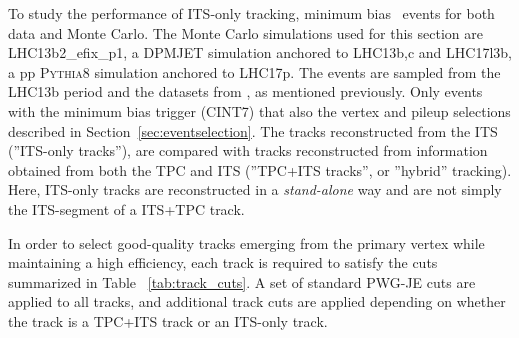 To study the performance of ITS-only tracking, minimum bias \pPb~events for both data and Monte Carlo. The Monte Carlo simulations used for this section are LHC13b2\_efix\_p1, a \textsc{DPMJET} simulation anchored to LHC13b,c and LHC17l3b, a pp \textsc{Pythia8} simulation anchored to LHC17p. The events are sampled from the LHC13b period and the datasets from \cite{Acharya:2018qsh}, as mentioned previously. Only events with the minimum bias trigger (CINT7) that also the vertex and pileup selections described in Section~\ref{sec:eventselection}. The tracks reconstructed from the ITS (''ITS-only tracks''), are compared with tracks reconstructed from information obtained from both the TPC and ITS (''TPC+ITS tracks'', or ''hybrid'' tracking). Here, ITS-only tracks are reconstructed in a \textit{stand-alone} way and are not simply the ITS-segment of a ITS+TPC track.

In order to select good-quality tracks emerging from the primary vertex while maintaining a high efficiency, each track is required to satisfy the cuts summarized in Table ~\ref{tab:track_cuts}. A set of standard PWG-JE cuts are applied to all tracks, and additional track cuts are applied depending on whether the track is a TPC+ITS track or an ITS-only track. 

